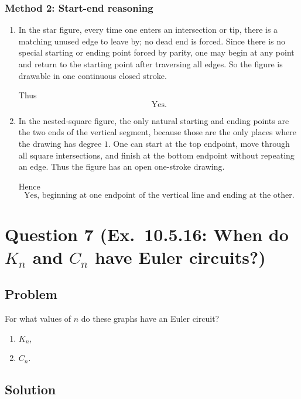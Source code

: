 \documentclass[12pt]{article}
\begin{document}
\subsubsection{Method 2: Start-end reasoning}
\begin{enumerate}[label=(\alph*)]
\item In the star figure, every time one enters an intersection or tip, there is a matching unused edge to leave by; no dead end is forced. Since there is no special starting or ending point forced by parity, one may begin at any point and return to the starting point after traversing all edges. So the figure is drawable in one continuous closed stroke.

Thus
\[
\boxed{\text{Yes.}}
\]

\item In the nested-square figure, the only natural starting and ending points are the two ends of the vertical segment, because those are the only places where the drawing has degree \(1\). One can start at the top endpoint, move through all square intersections, and finish at the bottom endpoint without repeating an edge. Thus the figure has an open one-stroke drawing.

Hence
\[
\boxed{\text{Yes, beginning at one endpoint of the vertical line and ending at the other.}}
\]
\end{enumerate}

\newpage

\section{Question 7 (Ex.\ 10.5.16: When do \(K_n\) and \(C_n\) have Euler circuits?)}

\subsection{Problem}
For what values of \(n\) do these graphs have an Euler circuit?
\begin{enumerate}[label=(\alph*)]
\item \(K_n\),
\item \(C_n\).
\end{enumerate}

\subsection{Solution}
\end{document}
